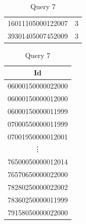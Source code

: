 \documentclass{article}
\begin{document}
\begin{table}[H]
\begin{minipage}{.29\linewidth}
\begin{tabular}{cc}
      16011105000122007 & 3 \\
      39301405007452009 & 3 \\
      \bottomrule
    \end{tabular}
    \caption*{Query 6}
  \end{minipage}
  \begin{minipage}{.29\linewidth}
    \centering
    \begin{tabular}{c}
      Id \\
      \midrule
      06000150000022000 \\
      06000150000012000 \\
      06000150000011999 \\
      07000550000011999 \\
      07001950000012001 \\
      \vdots \\
      76500050000012014 \\
      76570650000022000 \\
      78280250000022002 \\
      78360250000011999 \\
      79158050000022000 \\
      \bottomrule
    \end{tabular}
    \caption*{Query 7}
  \end{minipage}
\end{table}
\end{document}
